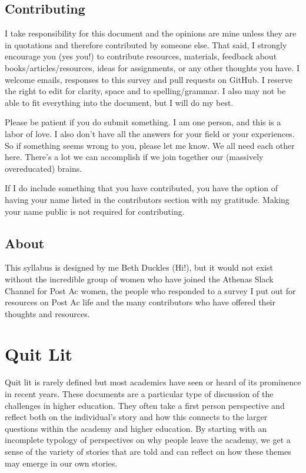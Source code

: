 \documentclass[]{book}
\theoremstyle{definition}
\theoremstyle{definition}
\theoremstyle{definition}
\theoremstyle{remark}
\begin{document}
\section{Contributing}\label{contributing}

I take responsibility for this document and the opinions are mine unless
they are in quotations and therefore contributed by someone else. That
said, I strongly encourage you (yes you!) to contribute resources,
materials, feedback about books/articles/resources, ideas for
assignments, or any other thoughts you have. I welcome emails, responses
to this survey and pull requests on GitHub. I reserve the right to edit
for clarity, space and to spelling/grammar. I also may not be able to
fit everything into the document, but I will do my best.

Please be patient if you do submit something. I am one person, and this
is a labor of love. I also don't have all the answers for your field or
your experiences. So if something seems wrong to you, please let me
know. We all need each other here. There's a lot we can accomplish if we
join together our (massively overeducated) brains.

If I do include something that you have contributed, you have the option
of having your name listed in the contributors section with my
gratitude. Making your name public is not required for contributing.

\section{About}\label{about}

This syllabus is designed by me Beth Duckles (Hi!), but it would not
exist without the incredible group of women who have joined the Athenas
Slack Channel for Post Ac women, the people who responded to a survey I
put out for resources on Post Ac life and the many contributors who have
offered their thoughts and resources.

\chapter{Quit Lit}\label{quit-lit}

Quit lit is rarely defined but most academics have seen or heard of its
prominence in recent years. These documents are a particular type of
discussion of the challenges in higher education. They often take a
first person perspective and reflect both on the individual's story and
how this connects to the larger questions within the academy and higher
education. By starting with an incomplete typology of perspectives on
why people leave the academy, we get a sense of the variety of stories
that are told and can reflect on how these themes may emerge in our own
stories.
\end{document}
